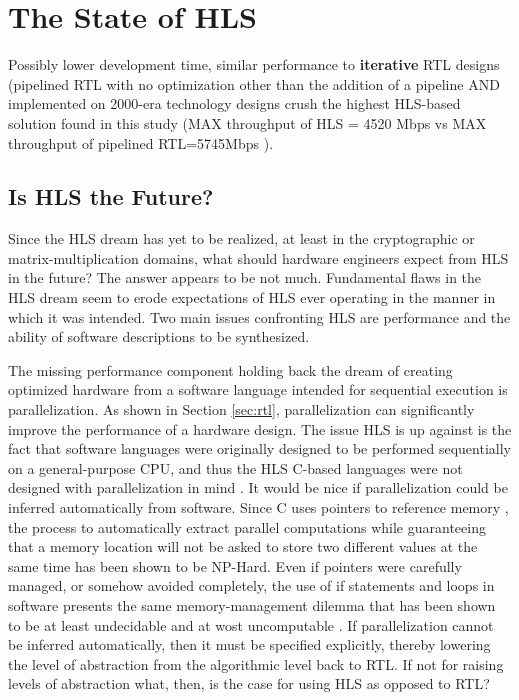 \documentclass[11pt,journal,compsoc, onecolumn]{IEEEtran}
\begin{document}
\section{The State of HLS}
Possibly lower development time, similar performance to \textbf{iterative} RTL designs (pipelined RTL with no optimization other than the addition of a pipeline AND implemented on 2000-era technology designs crush the highest HLS-based solution found in this study (MAX throughput of HLS = 4520 Mbps vs MAX throughput of pipelined RTL=5745Mbps \cite{nsaweeks}).
\subsection{Is HLS the Future?}\label{sec:future}
Since the HLS dream has yet to be realized, at least in the cryptographic \cite{sel} or matrix-multiplication \cite{skalicky} domains, what should hardware engineers expect from HLS in the future? The answer appears to be not much. Fundamental flaws in the HLS dream seem to erode expectations of HLS ever operating in the manner in which it was intended. Two main issues confronting HLS are performance and the ability of software descriptions to be synthesized. 

The missing performance component holding back the dream of creating optimized hardware from a software language intended for sequential execution is parallelization. As shown in Section \ref{sec:rtl}, parallelization can significantly improve the performance of a hardware design. The issue HLS is up against is the fact that software languages were originally designed to be performed sequentially on a general-purpose CPU, and thus the HLS C-based languages were not designed with parallelization in mind \cite{clanguage}. It would be nice if parallelization could be inferred automatically from software. Since C uses pointers to reference memory \cite{cpointers}, the process to automatically extract parallel computations while guaranteeing that a memory location will not be asked to store two different values at the same time has been shown to be NP-Hard\cite{aliasinghard}. Even if pointers were carefully managed, or somehow avoided completely, the use of if statements and loops in software presents the same memory-management dilemma that has been shown to be at least undecidable and at wost uncomputable \cite{staticanalysis}. If parallelization cannot be inferred automatically, then it must be specified explicitly, thereby lowering the level of abstraction from the algorithmic level back to RTL. If not for raising levels of abstraction what, then, is the case for using HLS as opposed to RTL?  
\end{document}
